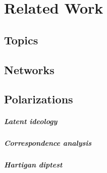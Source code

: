 
\chapter{Related Work}%

\ifpdf
    \graphicspath{{Chapter2/Figs/Raster/}{Chapter2/Figs/PDF/}{Chapter2/Figs/}}
\else
    \graphicspath{{Chapter2/Figs/Vector/}{Chapter2/Figs/}}
\fi


\section[Topics]{Topics}

\section[Networks]{Networks }
\section[Polarizations]{Polarizations}
\paragraph{Latent ideology}
\paragraph{Correspondence analysis }
\paragraph{Hartigan diptest}




